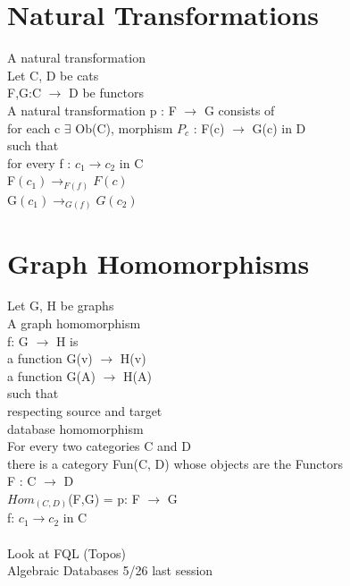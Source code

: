\documentclass{article}
\begin{document}
\section{Natural Transformations}
A natural transformation
\\
Let C, D be cats
\\
F,G:C $\rightarrow$ D be functors
\\
A natural transformation p : F $\rightarrow$ G consists of 
\\
for each c $\exists$ Ob(C), morphism $P_{c}$ : F(c) $\rightarrow$ G(c) in D
\\
such that
\\
for every f : $c_{1} \rightarrow c_{2}$ in C
\\
F$(c_{1}) \rightarrow_{F(f)} F(c)$
\\
G$(c_{1}) \rightarrow_{G(f)} G(c_{2})$
\\
\section{Graph Homomorphisms}
Let G, H be graphs
\\
A graph homomorphism
\\
f: G $\rightarrow$ H is 
\\
a function G(v) $\rightarrow$ H(v)
\\
a function G(A) $\rightarrow$ H(A)
\\
such that 
\\
respecting source and target
\\
database homomorphism
\\
For every two categories C and D 
\\
there is a category Fun(C, D) whose objects are the Functors
\\
F : C $\rightarrow$ D
\\
$Hom_{(C,D)}$(F,G) = p: F $\rightarrow$ G 
\\
f: $c_{1} \rightarrow c_{2}$ in C
\\
\\
Look at FQL (Topos)
\\
Algebraic Databases 5/26 last session
\\
\\
\end{document}
